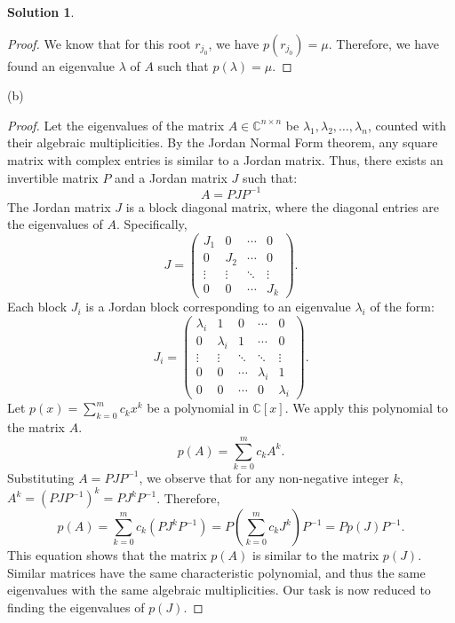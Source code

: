 \documentclass[12pt]{article}
\theoremstyle{definition}
\newtheorem*{solution}{\normalfont\textbf{Solution}}
\begin{document}
\begin{enumerate}[leftmargin=*]
\begin{solution}
\begin{proof}
                We know that for this root $r_{j_0}$, we have $p(r_{j_0}) = \mu$. Therefore, we have found an eigenvalue $\lambda$ of $A$ such that $p(\lambda) = \mu$.  
            \end{proof}
            \item[(b)]
            \begin{proof}
                Let the eigenvalues of the matrix $A \in \mathbb{C}^{n \times n}$ be $\lambda_1, \lambda_2, \ldots, \lambda_n$, counted with their algebraic multiplicities. By the Jordan Normal Form theorem, any square matrix with complex entries is similar to a Jordan matrix. Thus, there exists an invertible matrix $P$ and a Jordan matrix $J$ such that:
                \[
                A = PJP^{-1}
                \]
                The Jordan matrix $J$ is a block diagonal matrix, where the diagonal entries are the eigenvalues of $A$. Specifically,
                \[
                J = \begin{pmatrix}
                J_1 & 0 & \cdots & 0 \\
                0 & J_2 & \cdots & 0 \\
                \vdots & \vdots & \ddots & \vdots \\
                0 & 0 & \cdots & J_k
                \end{pmatrix}
                .\]
                Each block $J_i$ is a Jordan block corresponding to an eigenvalue $\lambda_i$ of the form:
                \[
                J_i = \begin{pmatrix}
                \lambda_i & 1 & 0 & \cdots & 0 \\
                0 & \lambda_i & 1 & \cdots & 0 \\
                \vdots & \vdots & \ddots & \ddots & \vdots \\
                0 & 0 & \cdots & \lambda_i & 1 \\
                0 & 0 & \cdots & 0 & \lambda_i
                \end{pmatrix}
                .\]
                Let $p(x) = \sum_{k=0}^{m} c_k x^k$ be a polynomial in $\mathbb{C}[x]$. We apply this polynomial to the matrix $A$.
                \[
                p(A) = \sum_{k=0}^{m} c_k A^k
                .\]
                Substituting $A = PJP^{-1}$, we observe that for any non-negative integer $k$, $A^k = (PJP^{-1})^k = PJ^kP^{-1}$. Therefore,
                \[
                p(A) = \sum_{k=0}^{m} c_k (PJ^kP^{-1}) = P \left( \sum_{k=0}^{m} c_k J^k \right) P^{-1} = P p(J) P^{-1}
                .\]
                This equation shows that the matrix $p(A)$ is similar to the matrix $p(J)$. Similar matrices have the same characteristic polynomial, and thus the same eigenvalues with the same algebraic multiplicities. Our task is now reduced to finding the eigenvalues of $p(J)$.


\end{proof}
\end{solution}
\end{enumerate}
\end{document}
